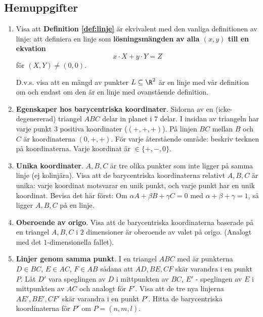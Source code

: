 \subsection{Hemuppgifter}

\begin{enumerate}

\item 
    Visa att \textbf{Definition \ref{def:linje}} är ekvivalent med den vanliga definitionen
    av linje: att definiera en linje
    som \textbf{lösningsmängden av alla $(x, y)$ till en ekvation}
    \[
    x\cdot X + y\cdot Y = Z
    \]
    för $(X, Y)\neq (0, 0)$.

    D.v.s. visa att en mängd av punkter $L\subseteq \R^2$ är en linje med vår definition om och endast om
    den är en linje med ovanstående definition.

\item\textbf{Egenskaper hos barycentriska koordinater}.
    Sidorna av en (icke-degenererad) triangel $ABC$ delar in planet i $7$ delar.
    I insidan av triangeln har varje punkt $3$ positiva koordinater ($(+,+,+)$). På
    linjen $BC$ mellan $B$ och $C$ är koordinaterna $(0, +, +)$. För varje återstående område: beskriv tecknen på koordinaterna. Varje koordinat är $\in \{+,-,0\}$.

\item \textbf{Unika koordinater}.
$A,B,C$ är tre olika punkter som inte ligger på samma linje (ej kolinjära).
Visa att de barycentriska koordinaterna relativt $A,B,C$ är unika: varje koordinat
motsvarar en unik punkt, och varje punkt har en unik koordinat.
{\tiny{
        Bevisa det här först: Om $\alpha A + \beta B + \gamma C = 0$ med $\alpha + \beta + \gamma = 1$, så ligger
        $A, B, C$ på en linje. } }

\item \textbf{Oberoende av origo}. Visa att de barycentriska koordinaterna 
    baserade på en triangel $A,B,C$ i $2$ dimensioner är oberoende av valet på origo.
    (Analogt med det $1$-dimensionella fallet).

        

\item \textbf{Linjer genom samma punkt}. 
    I en triangel $ABC$ med är punkterna $D \in BC$, $E \in AC$, $F \in AB$ sådana att
    $AD, BE, CF$ skär varandra i en punkt $P$. Låt $D'$ vara speglingen av $D$ i mittpunkten av $BC$,
    $E'$ - speglingen av $E$ i mittpunkten av $AC$ och analogt för $F'$. Visa att 
    de tre nya linjerna $AE', BE', CF'$ skär varandra i en punkt $P'$. Hitta de barycentriska 
    koordinaterna för $P'$ om $P = (n, m, l)$.
    


\end{enumerate}
